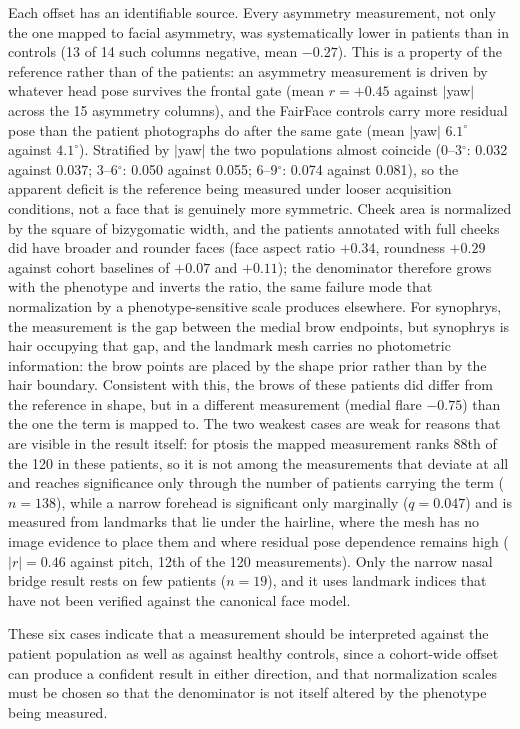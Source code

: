 \documentclass[11pt]{article}
\begin{document}
Each offset has an identifiable source. Every asymmetry measurement, not only the
one mapped to facial asymmetry, was systematically lower in patients than in
controls (13 of 14 such columns negative, mean $-0.27$). This is a property of the
reference rather than of the patients: an asymmetry measurement is driven by
whatever head pose survives the frontal gate (mean $r=+0.45$ against $|$yaw$|$
across the 15 asymmetry columns), and the FairFace controls carry more residual
pose than the patient photographs do after the same gate (mean $|$yaw$|$
$6.1^{\circ}$ against $4.1^{\circ}$). Stratified by $|$yaw$|$ the two populations
almost coincide (0--3$^{\circ}$: 0.032 against 0.037; 3--6$^{\circ}$: 0.050
against 0.055; 6--9$^{\circ}$: 0.074 against 0.081), so the apparent deficit is
the reference being measured under looser acquisition conditions, not a face that
is genuinely more symmetric. Cheek area is normalized by the square of bizygomatic width, and the
patients annotated with full cheeks did have broader and rounder faces
(face aspect ratio $+0.34$, roundness $+0.29$ against cohort baselines of $+0.07$
and $+0.11$); the denominator therefore grows with the phenotype and inverts the
ratio, the same failure mode that normalization by a phenotype-sensitive scale
produces elsewhere. For synophrys, the measurement is the gap between the medial
brow endpoints, but synophrys is hair occupying that gap, and the landmark mesh
carries no photometric information: the brow points are placed by the shape prior
rather than by the hair boundary. Consistent with this, the brows of these patients
did differ from the reference in shape, but in a different measurement
(medial flare $-0.75$) than the one the term is mapped to. The two weakest cases
are weak for reasons that are visible in the result itself: for ptosis the mapped
measurement ranks 88th of the 120 in these patients, so it is not among the
measurements that deviate at all and reaches significance only through the number
of patients carrying the term ($n=138$), while a narrow forehead is significant
only marginally ($q=0.047$) and is measured from landmarks that lie under the
hairline, where the mesh has no image evidence to place them and where residual
pose dependence remains high ($|r|=0.46$ against pitch, 12th of the 120
measurements). Only the
narrow nasal bridge result rests on few patients ($n=19$), and it uses landmark
indices that have not been verified against the canonical face model.

These six cases indicate that a measurement should be interpreted against the
patient population as well as against healthy controls, since a cohort-wide offset
can produce a confident result in either direction, and that normalization scales
must be chosen so that the denominator is not itself altered by the phenotype being
measured.
\end{document}

